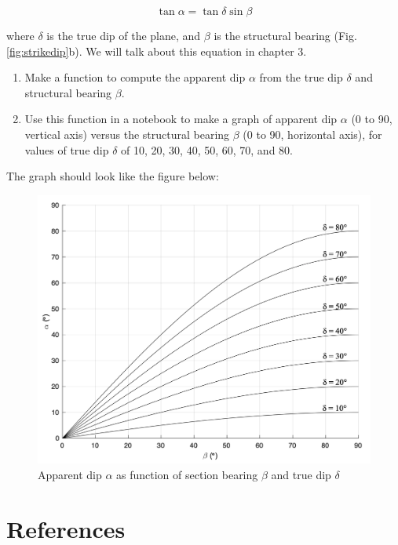 \documentclass[a4paper , 12pt]{book}
\begin{document}
\begin{enumerate}
    \begin{equation}
        \tan\alpha=\tan\delta\sin\beta
    \end{equation}
    
    where $\delta$ is the true dip of the plane, and $\beta$ is the structural bearing (Fig. \ref{fig:strikedip}b). We will talk about this equation in chapter 3. 
    
    \begin {enumerate}
    \item Make a function to compute the apparent dip $\alpha$ from the true dip $\delta$ and structural bearing $\beta$. 
    \item Use this function in a notebook to make a graph of apparent dip $\alpha$ (0 to 90\degree, vertical axis) versus the structural bearing $\beta$ (0 to 90\degree, horizontal axis), for values of true dip $\delta$ of 10, 20, 30, 40, 50, 60, 70, and 80\degree. 
    \end{enumerate}
    
    The graph should look like the figure below:
    
    \begin{figure}[H]
        \centering
        \includegraphics[width=12cm]{Figures/ch1f3.png}
        \caption{Apparent dip $\alpha$ as function of section bearing $\beta$ and true dip $\delta$}
        \label{fig:apparentdip}
    \end{figure}
\end{enumerate}

\section*{References}
\end{document}
